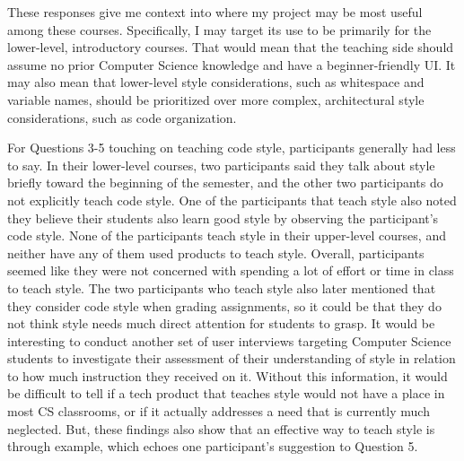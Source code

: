 \documentclass[10pt,twocolumn]{article}
\begin{document}
These responses give me context into where my project may be most useful among these courses. Specifically, I may target its use to be primarily for the lower-level, introductory courses. That would mean that the teaching side should assume no prior Computer Science knowledge and have a beginner-friendly UI. It may also mean that lower-level style considerations, such as whitespace and variable names, should be prioritized over more complex, architectural style considerations, such as code organization. 

For Questions 3-5 touching on teaching code style, participants generally had less to say. In their lower-level courses, two participants said they talk about style briefly toward the beginning of the semester, and the other two participants do not explicitly teach code style. One of the participants that teach style also noted they believe their students also learn good style by observing the participant’s code style. None of the participants teach style in their upper-level courses, and neither have any of them used products to teach style. Overall, participants seemed like they were not concerned with spending a lot of effort or time in class to teach style. The two participants who teach style also later mentioned that they consider code style when grading assignments, so it could be that they do not think style needs much direct attention for students to grasp. It would be interesting to conduct another set of user interviews targeting Computer Science students to investigate their assessment of their understanding of style in relation to how much instruction they received on it. Without this information, it would be difficult to tell if a tech product that teaches style would not have a place in most CS classrooms, or if it actually addresses a need that is currently much neglected. But, these findings also show that an effective way to teach style is through example, which echoes one participant’s suggestion to Question 5. 
\end{document}
